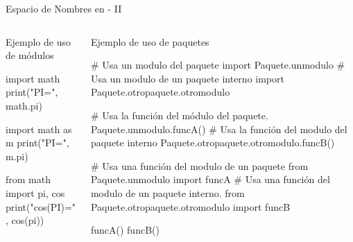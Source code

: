 \documentclass[10pt,envcountsect,spanish]{beamer}
\begin{document}
\begin{frame}[fragile]{Espacio de Nombres en  - II } 

\begin{columns}

\begin{column}{.4\textwidth}
Ejemplo de uso de módulos \footnotesize
	
\begin{pyconsole}[][frame=single]
import math 
print("PI=", math.pi)
\end{pyconsole}

\begin{pyconsole}[][frame=single, fontsize=\scriptsize]
import math as m
print("PI=", m.pi)
\end{pyconsole}

\begin{pyconsole}[][frame=single, fontsize=\scriptsize]
from math import pi, cos
print("cos(PI)=", cos(pi))
\end{pyconsole}

\end{column}

\begin{column}{.6\textwidth}
Ejemplo de uso de paquetes \footnotesize


\begin{pyverbatim}[][frame=single, fontsize=\scriptsize]
# Usa un modulo del paquete
import Paquete.unmodulo 
# Usa un modulo de un paquete interno 
import Paquete.otropaquete.otromodulo  

# Usa la función del módulo del paquete.
Paquete.unmodulo.funcA() 
# Usa la función del modulo del paquete interno
Paquete.otropaquete.otromodulo.funcB() 
\end{pyverbatim}


\begin{pyverbatim}[][frame=single, fontsize=\scriptsize]
# Usa una función del modulo de un paquete
from Paquete.unmodulo import funcA
# Usa una función del modulo de un paquete interno.
from Paquete.otropaquete.otromodulo import funcB 

funcA() 
funcB() 
\end{pyverbatim}


\end{column}

\end{columns}
\end{frame}
\end{document}
